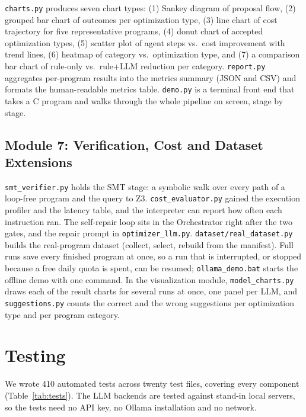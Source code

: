 \documentclass[12pt,a4paper]{report}
\begin{document}
\texttt{charts.py} produces seven chart types: (1) Sankey diagram of proposal flow, (2) grouped bar chart of outcomes per optimization type, (3) line chart of cost trajectory for five representative programs, (4) donut chart of accepted optimization types, (5) scatter plot of agent steps vs.\ cost improvement with trend lines, (6) heatmap of category vs.\ optimization type, and (7) a comparison bar chart of rule-only vs.\ rule+LLM reduction per category. \texttt{report.py} aggregates per-program results into the metrics summary (JSON and CSV) and formats the human-readable metrics table. \texttt{demo.py} is a terminal front end that takes a C program and walks through the whole pipeline on screen, stage by stage.

\subsection{Module 7: Verification, Cost and Dataset Extensions}

\texttt{smt\_verifier.py} holds the SMT stage: a symbolic walk over every path of a loop-free program and the query to Z3. \texttt{cost\_evaluator.py} gained the execution profiler and the latency table, and the interpreter can report how often each instruction ran. The self-repair loop sits in the Orchestrator right after the two gates, and the repair prompt in \texttt{optimizer\_llm.py}. \texttt{dataset/real\_dataset.py} builds the real-program dataset (collect, select, rebuild from the manifest). Full runs save every finished program at once, so a run that is interrupted, or stopped because a free daily quota is spent, can be resumed; \texttt{ollama\_demo.bat} starts the offline demo with one command. In the visualization module, \texttt{model\_charts.py} draws each of the result charts for several runs at once, one panel per LLM, and \texttt{suggestions.py} counts the correct and the wrong suggestions per optimization type and per program category.

\section{Testing}
\label{sec:testing}

We wrote 410 automated tests across twenty test files, covering every component (Table~\ref{tab:tests}). The LLM backends are tested against stand-in local servers, so the tests need no API key, no Ollama installation and no network.
\end{document}
